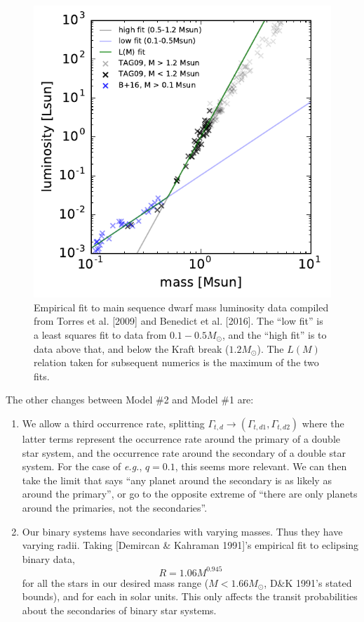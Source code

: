 \documentclass{emulateapj}
\begin{document}
\begin{figure}
	\begin{center}
		\includegraphics[scale=0.9]{figures/mass_luminosity.pdf}
	\end{center}
	\caption{Empirical fit to main sequence dwarf mass luminosity data compiled 
	from Torres et al. [2009] and Benedict et al. [2016]. The ``low fit'' is a 
	least squares fit to data from $0.1-0.5M_\odot$, and the ``high fit'' is to 
	data above that, and below the Kraft break ($1.2M_\odot$).
	The $L(M)$ relation taken for subsequent numerics is the maximum 
	of the two fits.
	}
	\label{fig:mass_luminosity}
\end{figure}

The other changes between Model \#2 and Model \#1 are:
\begin{enumerate}
\item We allow a third occurrence rate, splitting $\Gamma_{t,d} \rightarrow 
(\Gamma_{t,d1}, \Gamma_{t,d2})$ where the latter terms represent the occurrence 
rate around the primary of a double star system, and the occurrence rate around 
the secondary of a double star system. For the case of \textit{e.g.}, $q=0.1$, 
this seems more relevant.
We can then take the limit that says ``any planet around the secondary is as 
likely as around the primary'', or go to the opposite extreme of ``there are 
only planets around the primaries, not the secondaries''.
%
\item Our binary systems have secondaries with varying masses. Thus they have 
varying radii. Taking [Demircan \& Kahraman 1991]'s empirical fit to eclipsing 
binary data,
\begin{equation}
R = 1.06 M^{0.945}
\label{eq:mass_radius}
\end{equation}
for all the stars in our desired mass range ($M < 1.66M_\odot$, D\&K 1991's 
stated bounds), and for each in solar units. This only affects the transit 
probabilities about the secondaries of binary star systems.
\end{enumerate}
\end{document}
